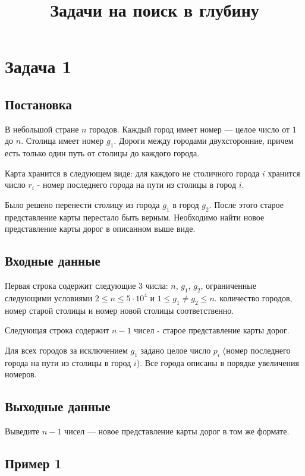 \documentclass{extarticle}
\date{}
\title{Задачи на поиск в глубину}
\begin{document}
\section*{Задача 1}
\label{sec:orgb62fe60}
\subsection*{Постановка}
\label{sec:org37954e9}

В небольшой стране \(n\) городов.
Каждый город имеет номер — целое число от \(1\) до \(n\).
Столица имеет номер \(g_{1}\).
Дороги между городами двухсторонние, причем
есть только один путь от столицы до каждого города.

Карта хранится в следующем виде:
для каждого не столичного города \(i\) хранится число \(r_{i}\) -
номер последнего города на пути из столицы в город \(i\).

Было решено перенести столицу из города \(g_{1}\) в город \(g_{2}\).
После этого старое представление карты перестало быть верным.
Необходимо найти новое представление карты дорог в описанном выше виде.

\subsection*{Входные данные}
\label{sec:orgc51833b}

Первая строка содержит следующие 3 числа:
\(n\), \(g_{1}\), \(g_{2}\),
ограниченные следующими условиями
\(2 \leq n \leq 5 \cdot 10^{4}\) и \(1 \leq g_{1} \neq g_{2} \leq n\).
количество городов,
номер старой столицы и номер новой столицы соответственно.

Следующая строка содержит \(n-1\) чисел - старое представление карты дорог.

Для всех городов за исключением \(g_{1}\) задано целое число \(p_{i}\)
(номер последнего города на пути из столицы в город \(i\)).
Все города описаны в порядке увеличения номеров.

\subsection*{Выходные данные}
\label{sec:org91cd1c2}

Выведите \(n - 1\) чисел — новое представление карты дорог в том же формате.

\subsection*{Пример 1}
\label{sec:org1b720b0}
\end{document}

